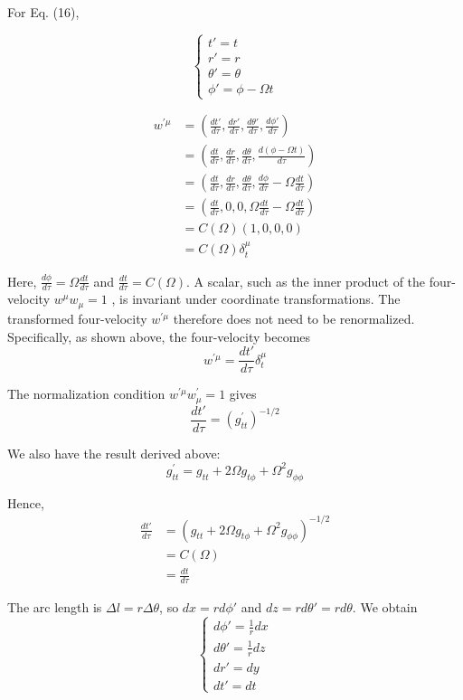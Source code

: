 \documentclass[english]{article}
\begin{document}
For Eq. (16),

\[
\begin{cases}
t'=t\\
r'=r\\
\theta'=\theta\\
\phi'=\phi-\Omega t
\end{cases}
\]

\begin{align*}
w^{'\mu} & =\left(\frac{dt'}{d\tau},\frac{dr'}{d\tau},\frac{d\theta'}{d\tau},\frac{d\phi'}{d\tau}\right)\\
 & =\left(\frac{dt}{d\tau},\frac{dr}{d\tau},\frac{d\theta}{d\tau},\frac{d\left(\phi-\Omega t\right)}{d\tau}\right)\\
 & =\left(\frac{dt}{d\tau},\frac{dr}{d\tau},\frac{d\theta}{d\tau},\frac{d\phi}{d\tau}-\Omega\frac{dt}{d\tau}\right)\\
 & =\left(\frac{dt}{d\tau},0,0,\Omega\frac{dt}{d\tau}-\Omega\frac{dt}{d\tau}\right)\\
 & =C\left(\Omega\right)\left(1,0,0,0\right)\\
 & =C\left(\Omega\right)\delta^{\mu}_{\!t}
\end{align*}

Here, $\frac{d\phi}{d\tau}=\Omega\frac{dt}{d\tau}$ and $\frac{dt}{d\tau}=C\left(\Omega\right)$.
A scalar, such as  the inner product of the four-velocity $w^{\mu}w_{\mu}=1$
, is invariant under coordinate transformations. The transformed four-velocity
$w^{'\mu}$ therefore does not need to be renormalized. Specifically,
as shown above, the four-velocity becomes 
\[
w^{'\mu}=\frac{dt'}{d\tau}\delta^{\mu}_{\!t}
\]

The normalization condition $w^{'\mu}w^{'}_{\mu}=1$ gives 
\[
\frac{dt'}{d\tau}=\left(g^{'}_{tt}\right)^{-1/2}
\]

We also have the result derived above: 
\[
g^{'}_{tt}=g_{tt}+2\Omega g_{t\phi}+\Omega^{2}g_{\phi\phi}
\]

Hence, 
\begin{align*}
\frac{dt'}{d\tau} & =\left(g_{tt}+2\Omega g_{t\phi}+\Omega^{2}g_{\phi\phi}\right)^{-1/2}\\
 & =C\left(\Omega\right)\\
 & =\frac{dt}{d\tau}
\end{align*}

The arc length is $\Delta l=r\Delta\theta$, so $dx=rd\phi'$ and
$dz=rd\theta'=rd\theta$. We obtain 
\[
\begin{cases}
d\phi'=\frac{1}{r}dx\\
d\theta'=\frac{1}{r}dz\\
dr'=dy\\
dt'=dt
\end{cases}
\]
\end{document}
